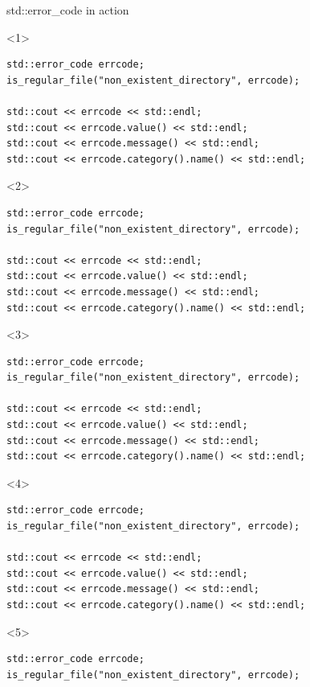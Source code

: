 \documentclass[10pt]{beamer}
\begin{document}
\begin{frame}[fragile]{std::error\_code in action}
	\begin{onlyenv}
	\begin{verbatim}
std::error_code errcode;
is_regular_file("non_existent_directory", errcode);

std::cout << errcode << std::endl;
std::cout << errcode.value() << std::endl;
std::cout << errcode.message() << std::endl;
std::cout << errcode.category().name() << std::endl;
	\end{verbatim}
	\end{onlyenv}

	\begin{onlyenv}
	\begin{verbatim}
std::error_code errcode;
is_regular_file("non_existent_directory", errcode);

std::cout << errcode << std::endl;
std::cout << errcode.value() << std::endl;
std::cout << errcode.message() << std::endl;
std::cout << errcode.category().name() << std::endl;
	\end{verbatim}
	\end{onlyenv}

	\begin{onlyenv}
	\begin{verbatim}
std::error_code errcode;
is_regular_file("non_existent_directory", errcode);

std::cout << errcode << std::endl;
std::cout << errcode.value() << std::endl;
std::cout << errcode.message() << std::endl;
std::cout << errcode.category().name() << std::endl;
	\end{verbatim}
	\end{onlyenv}

	\begin{onlyenv}
	\begin{verbatim}
std::error_code errcode;
is_regular_file("non_existent_directory", errcode);

std::cout << errcode << std::endl;
std::cout << errcode.value() << std::endl;
std::cout << errcode.message() << std::endl;
std::cout << errcode.category().name() << std::endl;
	\end{verbatim}
	\end{onlyenv}

	\begin{onlyenv}
	\begin{verbatim}
std::error_code errcode;
is_regular_file("non_existent_directory", errcode);


\end{verbatim}
\end{onlyenv}
\end{frame}
\end{document}
